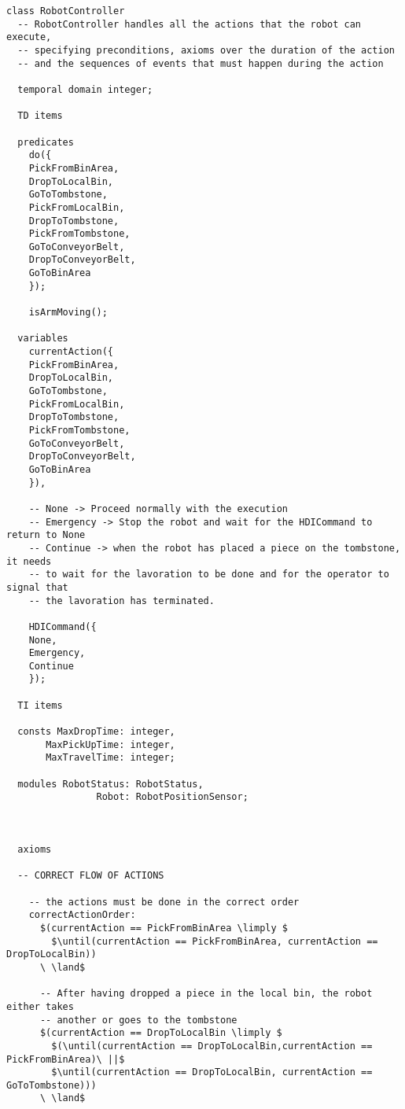 \begin{lstlisting}[fontadjust, mathescape, frame=single]
class RobotController
  -- RobotController handles all the actions that the robot can execute, 
  -- specifying preconditions, axioms over the duration of the action
  -- and the sequences of events that must happen during the action

  temporal domain integer;

  TD items

  predicates
    do({
    PickFromBinArea,
    DropToLocalBin,
    GoToTombstone,
    PickFromLocalBin,
    DropToTombstone,
    PickFromTombstone,
    GoToConveyorBelt,
    DropToConveyorBelt,
    GoToBinArea
    });

    isArmMoving();

  variables
    currentAction({
    PickFromBinArea,
    DropToLocalBin,
    GoToTombstone,
    PickFromLocalBin,
    DropToTombstone,
    PickFromTombstone,
    GoToConveyorBelt,
    DropToConveyorBelt,
    GoToBinArea
    }),

    -- None -> Proceed normally with the execution
    -- Emergency -> Stop the robot and wait for the HDICommand to return to None
    -- Continue -> when the robot has placed a piece on the tombstone, it needs 
    -- to wait for the lavoration to be done and for the operator to signal that 
    -- the lavoration has terminated.

    HDICommand({
    None,
    Emergency,
    Continue
    });
    
  TI items 
  
  consts MaxDropTime: integer,
       MaxPickUpTime: integer,
       MaxTravelTime: integer;

  modules RobotStatus: RobotStatus,
                Robot: RobotPositionSensor;

  
  
  axioms

  -- CORRECT FLOW OF ACTIONS

    -- the actions must be done in the correct order
    correctActionOrder:
      $(currentAction == PickFromBinArea \limply $
        $\until(currentAction == PickFromBinArea, currentAction == DropToLocalBin))
      \ \land$

      -- After having dropped a piece in the local bin, the robot either takes 
      -- another or goes to the tombstone
      $(currentAction == DropToLocalBin \limply $
        $(\until(currentAction == DropToLocalBin,currentAction == PickFromBinArea)\ ||$
        $\until(currentAction == DropToLocalBin, currentAction == GoToTombstone)))
      \ \land$


\end{lstlisting}
